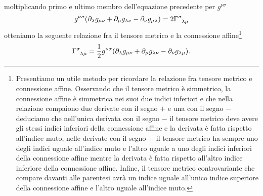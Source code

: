 moltiplicando primo e ultimo membro dell'equazione precedente per
$g^{\nu\sigma}$
\begin{equation}
  g^{\nu\sigma}(\partial_{\lambda}g_{\mu\nu} + \partial_{\mu}g_{\lambda\nu}
  - \partial_{\nu}g_{\mu\lambda}) = 2\tensor{\Gamma}{^{\sigma}_{\lambda\mu}}
\end{equation}
otteniamo la seguente relazione fra il tensore metrico e
la connessione
affine\footnote{Presentiamo un utile metodo per ricordare la relazione fra
  tensore metrico e connessione affine.  Osservando che il tensore metrico è
  simmetrico, la connessione affine è simmetrica nei suoi due indici inferiori e
  che nella relazione compaiono due derivate con il segno $+$ e una con il segno
  $-$ deduciamo che nell'unica derivata con il segno $-$ il tensore metrico deve
  avere gli stessi indici inferiori della connessione affine e la derivata è
  fatta rispetto all'indice muto, nelle derivate con il segno $+$ il tensore
  metrico ha sempre uno degli indici uguale all'indice muto e l'altro uguale a
  uno degli indici inferiori della connessione affine mentre la derivata è fatta
  rispetto all'altro indice inferiore della connessione affine.  Infine, il
  tensore metrico controvariante che compare davanti alle parentesi avrà un
  indice uguale all'unico indice superiore della connessione affine e l'altro
  uguale all'indice muto.}
\begin{equation}
  \label{eq:connessione-metrica}
  \tensor{\Gamma}{^{\sigma}_{\lambda\mu}} =
  \frac{1}{2} g^{\nu\sigma} (\partial_{\lambda}g_{\mu\nu}
  + \partial_{\mu}g_{\lambda\nu} - \partial_{\nu}g_{\lambda\mu}).
\end{equation}

